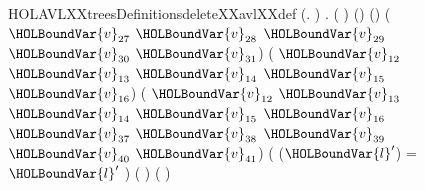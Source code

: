 \newcommand{\HOLAVLXXtreesDefinitionscompleteXXavlXXdef}{\UseVerbatim{HOLAVLXXtreesDefinitionscompleteXXavlXXdef}}
\begin{SaveVerbatim}{HOLAVLXXtreesDefinitionsdeleteXXavlXXdef}
\HOLTokenTurnstile{} (\HOLSymConst{\HOLTokenForall{}}.    \HOLSymConst{=} ) \HOLSymConst{\HOLTokenConj{}}
   \HOLSymConst{\HOLTokenForall{}}     .
       (     ) \HOLSymConst{=}
       \HOLSymConst{=}  
        (\HOLSymConst{,}) 
         (\HOLSymConst{,}) \HOLTokenImp{} 
       \HOLTokenBar{} (\HOLSymConst{,} \ensuremath{\HOLBoundVar{v}\sb{\mathrm{27}}} \ensuremath{\HOLBoundVar{v}\sb{\mathrm{28}}} \ensuremath{\HOLBoundVar{v}\sb{\mathrm{29}}} \ensuremath{\HOLBoundVar{v}\sb{\mathrm{30}}} \ensuremath{\HOLBoundVar{v}\sb{\mathrm{31}}}) \HOLTokenImp{} 
       \HOLTokenBar{} ( \ensuremath{\HOLBoundVar{v}\sb{\mathrm{12}}} \ensuremath{\HOLBoundVar{v}\sb{\mathrm{13}}} \ensuremath{\HOLBoundVar{v}\sb{\mathrm{14}}} \ensuremath{\HOLBoundVar{v}\sb{\mathrm{15}}} \ensuremath{\HOLBoundVar{v}\sb{\mathrm{16}}}\HOLSymConst{,}) \HOLTokenImp{} 
       \HOLTokenBar{} ( \ensuremath{\HOLBoundVar{v}\sb{\mathrm{12}}} \ensuremath{\HOLBoundVar{v}\sb{\mathrm{13}}} \ensuremath{\HOLBoundVar{v}\sb{\mathrm{14}}} \ensuremath{\HOLBoundVar{v}\sb{\mathrm{15}}} \ensuremath{\HOLBoundVar{v}\sb{\mathrm{16}}}\HOLSymConst{,} \ensuremath{\HOLBoundVar{v}\sb{\mathrm{37}}} \ensuremath{\HOLBoundVar{v}\sb{\mathrm{38}}} \ensuremath{\HOLBoundVar{v}\sb{\mathrm{39}}} \ensuremath{\HOLBoundVar{v}\sb{\mathrm{40}}} \ensuremath{\HOLBoundVar{v}\sb{\mathrm{41}}}) \HOLTokenImp{}
         (
            (\HOLSymConst{,}\HOLSymConst{,}\ensuremath{\HOLBoundVar{l}\sp{\prime{}}}) =  
               \ensuremath{\HOLBoundVar{l}\sp{\prime{}}} )
        \HOLSymConst{\HOLTokenLt{}}      (  ) 
          (  )
\end{SaveVerbatim}
